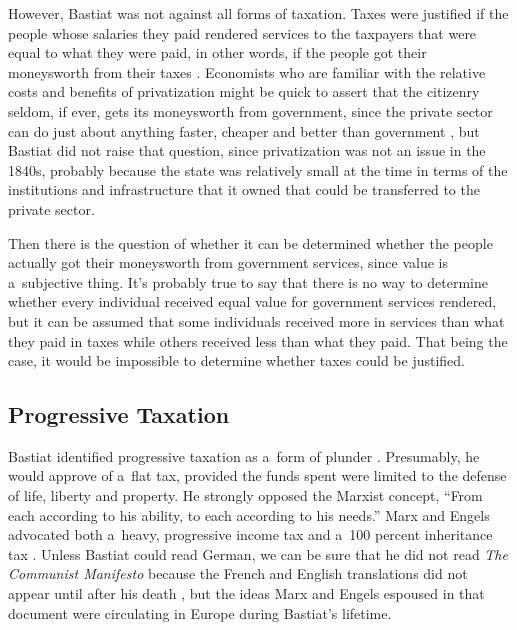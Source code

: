 However, Bastiat was not against all forms of taxation. Taxes were justified if the people whose salaries they paid rendered services to the taxpayers that were equal to what they were paid, in other words, if the people got their moneysworth from their taxes 
\parencite[][p.182]{bastiat_selected_1964}. %
 Economists who are familiar with the relative costs and benefits of privatization might be quick to assert that the citizenry seldom, if ever, gets its moneysworth from government, since the private sector can do just about anything faster, cheaper and better than government 
\parencites[][]{finley_public_1989}[][]{}[][]{pirie_privatization_1988}[][]{}, %
 but Bastiat did not raise that question, since privatization was not an issue in the 1840s, probably because the state was relatively small at the time in terms of the institutions and infrastructure that it owned that could be transferred to the private sector.



Then there is the question of whether it can be determined whether the people actually got their moneysworth from government services, since value is a~subjective thing. It's probably true to say that there is no way to determine whether every individual received equal value for government services rendered, but it can be assumed that some individuals received more in services than what they paid in taxes while others received less than what they paid. That being the case, it would be impossible to determine whether taxes could be justified.



\subsection{Progressive Taxation}



Bastiat identified progressive taxation as a~form of plunder 
\parencite[][pp.18]{}. %
 Presumably, he would approve of a~flat tax, provided the funds spent were limited to the defense of life, liberty and property. He strongly opposed the Marxist concept, ``From each according to his ability, to each according to his needs.'' 
\parencite[][]{marx_kritik_1875} %
 Marx and Engels advocated both a~heavy, progressive income tax and a~100 percent inheritance tax 
\parencite[][]{marx_manifest_1848}. %
 Unless Bastiat could read German, we can be sure that he did not read \textit{The Communist Manifesto} 
\parencite[][]{marx_manifest_1848} %
 because the French and English translations did not appear until after his death 
\parencite[see][]{marx_communist_2010}, %
 but the ideas Marx and Engels espoused in that document were circulating in Europe during Bastiat's lifetime.



